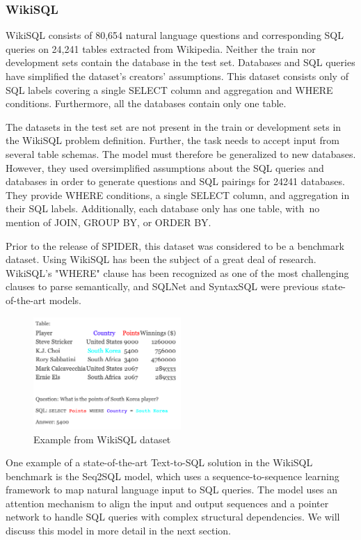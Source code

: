 \subsubsection{WikiSQL}

WikiSQL\cite{DBLP:journals/corr/abs-1902-01069} consists of 80,654 natural language questions and corresponding SQL queries on 24,241 tables extracted from Wikipedia. Neither the train nor development sets contain the database in the test set. Databases and SQL queries have simplified the dataset's creators' assumptions. This dataset consists only of SQL labels covering a single SELECT column and aggregation and WHERE conditions. Furthermore, all the databases contain only one table.

The datasets in the test set are not present in the train or development sets in the WikiSQL problem definition. Further, the task needs to accept input from several table schemas. The model must therefore be generalized to new databases. However, they used oversimplified assumptions about the SQL queries and databases in order to generate questions and SQL pairings for 24241 databases. They provide WHERE conditions, a single SELECT column, and aggregation in their SQL labels. Additionally, each database only has one table, with no mention of JOIN, GROUP BY, or ORDER BY.

Prior to the release of SPIDER, this dataset was considered to be a benchmark dataset. Using WikiSQL has been the subject of a great deal of research. WikiSQL's "WHERE" clause has been recognized as one of the most challenging clauses to parse semantically, and SQLNet and SyntaxSQL were previous state-of-the-art models.


\begin{figure}[H]
    \centering
    \includegraphics[width=0.5\textwidth]{pics/db/WikiSQL.png}
    \caption{Example from WikiSQL dataset\cite{DBLP:journals/corr/abs-1902-01069}}
    \label{fig:WikiSQL}
\end{figure}

One example of a state-of-the-art Text-to-SQL solution in the WikiSQL benchmark is the Seq2SQL model, which uses a sequence-to-sequence learning framework to map natural language input to SQL queries. The model uses an attention mechanism to align the input and output sequences and a pointer network to handle SQL queries with complex structural dependencies. We will discuss this model in more detail in the next section.